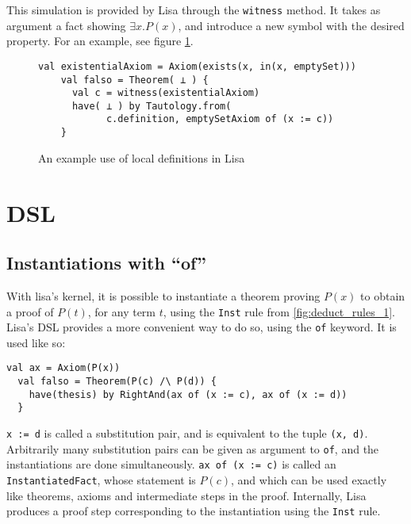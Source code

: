 This simulation is provided by Lisa through the \lstinline|witness|{} method. It takes as argument a fact showing $\exists x. P(x)$, and introduce a new symbol with the desired property. For an example, see figure \ref{fig:localDefinitionExample}.

\begin{figure}
  \begin{lstlisting}[language=lisa, frame=single]
    val existentialAxiom = Axiom(exists(x, in(x, emptySet)))
    val falso = Theorem( ⊥ ) {
      val c = witness(existentialAxiom)
      have( ⊥ ) by Tautology.from(
            c.definition, emptySetAxiom of (x := c))
    }
  \end{lstlisting}
  \caption{An example use of local definitions in Lisa}
  \label{fig:localDefinitionExample}
  \end{figure}


\section{DSL}

\subsection{Instantiations with ``of''}

With lisa's kernel, it is possible to instantiate a theorem proving $P(x)$ to obtain a proof of $P(t)$, for any term $t$, using the \texttt{Inst} rule from \autoref{fig:deduct_rules_1}. Lisa's DSL provides a more convenient way to do so, using the \lstinline|of| keyword. It is used like so:
\begin{lstlisting}[language=lisa, frame=single]
  val ax = Axiom(P(x))
  val falso = Theorem(P(c) /\ P(d)) {
    have(thesis) by RightAnd(ax of (x := c), ax of (x := d))
  }
\end{lstlisting}
\lstinline|x := d| is called a substitution pair, and is equivalent to the tuple \lstinline|(x, d)|. Arbitrarily many substitution pairs can be given as argument to \lstinline|of|, and the instantiations are done simultaneously. \lstinline|ax of (x := c)| is called an \lstinline|InstantiatedFact|, whose statement is $P(c)$, and which can be used exactly like theorems, axioms and intermediate steps in the proof. Internally, Lisa produces a proof step corresponding to the instantiation using the \texttt{Inst} rule.

